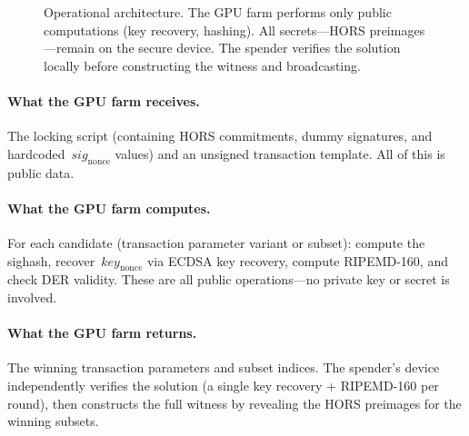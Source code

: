 \documentclass[11pt, a4paper]{article}
\begin{document}
\begin{figure}[H]
\caption{Operational architecture. The GPU farm performs only public computations (key recovery, hashing). All secrets---HORS preimages---remain on the secure device. The spender verifies the solution locally before constructing the witness and broadcasting.}
\label{fig:operational-architecture}
\end{figure}

\paragraph{What the GPU farm receives.}
The locking script (containing HORS commitments, dummy signatures, and hardcoded~$\mathit{sig}_{\mathrm{nonce}}$ values) and an unsigned transaction template. All of this is public data.

\paragraph{What the GPU farm computes.}
For each candidate (transaction parameter variant or subset): compute the sighash, recover~$\mathit{key}_{\mathrm{nonce}}$ via ECDSA key recovery, compute RIPEMD-160, and check DER validity. These are all public operations---no private key or secret is involved.

\paragraph{What the GPU farm returns.}
The winning transaction parameters and subset indices. The spender's device independently verifies the solution (a single key recovery + RIPEMD-160 per round), then constructs the full witness by revealing the HORS preimages for the winning subsets.
\end{document}
